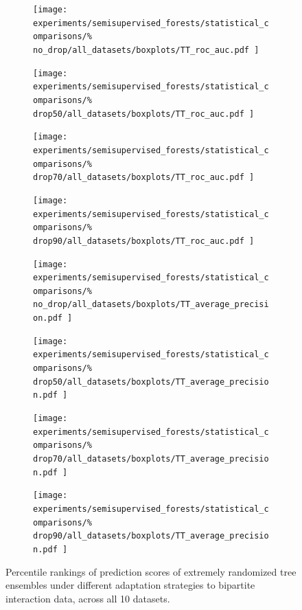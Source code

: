\begin{figure}[tb]
    \begin{subfigure}{0.24\textwidth}
        \texttt{[image: 
            experiments/semisupervised\_forests/statistical\_comparisons/\%
            no\_drop/all\_datasets/boxplots/TT\_roc\_auc.pdf
        ]}
    \end{subfigure}
    \begin{subfigure}{0.24\textwidth}
        \texttt{[image: 
            experiments/semisupervised\_forests/statistical\_comparisons/\%
            drop50/all\_datasets/boxplots/TT\_roc\_auc.pdf
        ]}
    \end{subfigure}
    \begin{subfigure}{0.24\textwidth}
        \texttt{[image: 
            experiments/semisupervised\_forests/statistical\_comparisons/\%
            drop70/all\_datasets/boxplots/TT\_roc\_auc.pdf
        ]}
    \end{subfigure}
    \begin{subfigure}{0.24\textwidth}
        \texttt{[image: 
            experiments/semisupervised\_forests/statistical\_comparisons/\%
            drop90/all\_datasets/boxplots/TT\_roc\_auc.pdf
        ]}
    \end{subfigure}

    \begin{subfigure}{0.24\textwidth}
        \texttt{[image: 
            experiments/semisupervised\_forests/statistical\_comparisons/\%
            no\_drop/all\_datasets/boxplots/TT\_average\_precision.pdf
        ]}
    \end{subfigure}
    \begin{subfigure}{0.24\textwidth}
        \texttt{[image: 
            experiments/semisupervised\_forests/statistical\_comparisons/\%
            drop50/all\_datasets/boxplots/TT\_average\_precision.pdf
        ]}
    \end{subfigure}
    \begin{subfigure}{0.24\textwidth}
        \texttt{[image: 
            experiments/semisupervised\_forests/statistical\_comparisons/\%
            drop70/all\_datasets/boxplots/TT\_average\_precision.pdf
        ]}
    \end{subfigure}
    \begin{subfigure}{0.24\textwidth}
        \texttt{[image: 
            experiments/semisupervised\_forests/statistical\_comparisons/\%
            drop90/all\_datasets/boxplots/TT\_average\_precision.pdf
        ]}
    \end{subfigure}

    \caption{
        Percentile rankings of prediction scores of extremely randomized tree ensembles under different adaptation strategies to bipartite interaction data, across all 10 datasets.
    }
    \label{fig:ss_comparison}
\end{figure}


